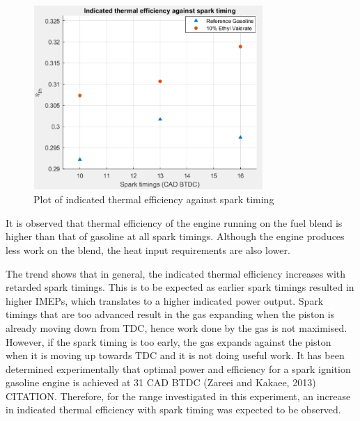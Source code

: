 \documentclass[11pt]{article}
\begin{document}
\begin{figure}[H]
    \centering
    \includegraphics[height = 7cm]{./img/diagram1.png}
    \caption{Plot of indicated thermal efficiency against spark timing}
    \label{q3-f1}
\end{figure}
It is observed that thermal efficiency of the engine running on the fuel blend is higher than that of gasoline at all spark timings. Although the engine produces less work on the blend, the heat input requirements are also lower. 

The trend shows that in general, the indicated thermal efficiency increases with retarded spark timings. This is to be expected as earlier spark timings resulted in higher IMEPs, which translates to a higher indicated power output. Spark timings that are too advanced result in the gas expanding when the piston is already moving down from TDC, hence work done by the gas is not maximised. However, if the spark timing is too early, the gas expands against the piston when it is moving up towards TDC and it is not doing useful work. It has been determined experimentally that optimal power and efficiency for a spark ignition gasoline engine is achieved at 31 CAD BTDC (Zareei and Kakaee, 2013) CITATION. Therefore, for the range investigated in this experiment, an increase in indicated thermal efficiency with spark timing was expected to be observed.
\end{document}

